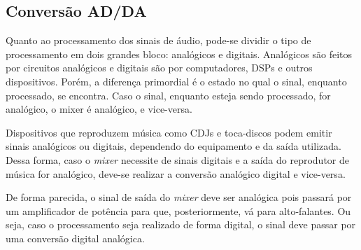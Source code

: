 \subsection{Conversão AD/DA}
Quanto ao processamento dos sinais de áudio, pode-se dividir o tipo de processamento em dois grandes bloco: analógicos e digitais. Analógicos são feitos por circuitos analógicos e digitais são por computadores, DSPs e outros dispositivos. Porém, a diferença primordial é o estado no qual o sinal, enquanto processado, se encontra. Caso o sinal, enquanto esteja sendo processado, for analógico, o mixer é analógico, e vice-versa.
\par
Dispositivos que reproduzem música como CDJs e toca-discos podem emitir sinais analógicos ou digitais, dependendo do equipamento e da saída utilizada. 
Dessa forma, caso o \textit{mixer} necessite de sinais digitais e a saída do reprodutor de música for analógico, deve-se realizar a conversão analógico digital e vice-versa.
\par
De forma parecida, o sinal de saída do \textit{mixer} deve ser analógica pois passará por um amplificador de potência para que, posteriormente, vá para alto-falantes. Ou seja, caso o processamento seja realizado de forma digital, o sinal deve passar por uma conversão digital analógica.






